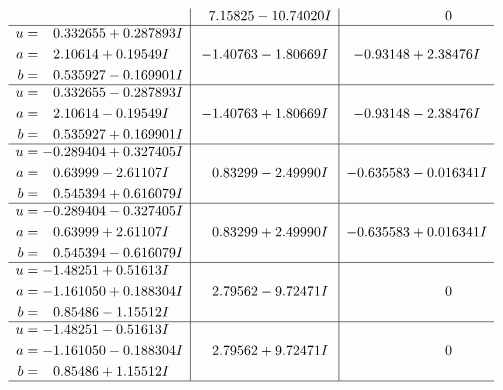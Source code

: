 \documentclass[1p]{elsarticle_modified}
\theoremstyle{definition}
\begin{document}
$$\begin{array}{c|c|c}
 & \phantom{-}7.15825 - 10.74020 I & \phantom{-0.000000 } 0 \\ \hline\begin{aligned}
u &= \phantom{-}0.332655 + 0.287893 I \\
a &= \phantom{-}2.10614 + 0.19549 I \\
b &= \phantom{-}0.535927 - 0.169901 I\end{aligned}
 & -1.40763 - 1.80669 I & -0.93148 + 2.38476 I \\ \hline\begin{aligned}
u &= \phantom{-}0.332655 - 0.287893 I \\
a &= \phantom{-}2.10614 - 0.19549 I \\
b &= \phantom{-}0.535927 + 0.169901 I\end{aligned}
 & -1.40763 + 1.80669 I & -0.93148 - 2.38476 I \\ \hline\begin{aligned}
u &= -0.289404 + 0.327405 I \\
a &= \phantom{-}0.63999 - 2.61107 I \\
b &= \phantom{-}0.545394 + 0.616079 I\end{aligned}
 & \phantom{-}0.83299 - 2.49990 I & -0.635583 - 0.016341 I \\ \hline\begin{aligned}
u &= -0.289404 - 0.327405 I \\
a &= \phantom{-}0.63999 + 2.61107 I \\
b &= \phantom{-}0.545394 - 0.616079 I\end{aligned}
 & \phantom{-}0.83299 + 2.49990 I & -0.635583 + 0.016341 I \\ \hline\begin{aligned}
u &= -1.48251 + 0.51613 I \\
a &= -1.161050 + 0.188304 I \\
b &= \phantom{-}0.85486 - 1.15512 I\end{aligned}
 & \phantom{-}2.79562 - 9.72471 I & \phantom{-0.000000 } 0 \\ \hline\begin{aligned}
u &= -1.48251 - 0.51613 I \\
a &= -1.161050 - 0.188304 I \\
b &= \phantom{-}0.85486 + 1.15512 I\end{aligned}
 & \phantom{-}2.79562 + 9.72471 I & \phantom{-0.000000 } 0\\
 \hline 
 \end{array}$$\newpage$$\begin{array}{c|c|c}  

\end{array}$$
\end{document}
